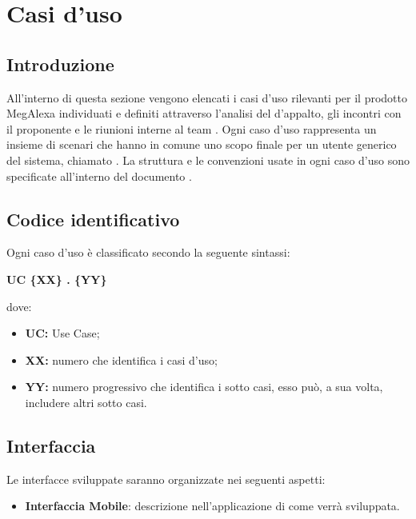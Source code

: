 \section{Casi d'uso}

\subsection{Introduzione}
All'interno di questa sezione vengono elencati i casi d'uso rilevanti per il prodotto
MegAlexa individuati e definiti attraverso l'analisi del  d'appalto,
gli incontri con il proponente e le riunioni interne al team \groupName{}.
Ogni caso d'uso rappresenta un insieme di scenari che hanno in comune uno scopo finale per un utente generico del sistema, chiamato .
La struttura e le convenzioni usate in ogni caso d'uso sono specificate all'interno del documento \docNameVersionNdP{}.

\subsection{Codice identificativo}
Ogni caso d'uso è classificato secondo la seguente sintassi:

\begin{center}
\textbf{UC \{XX\} . \{YY\}}
\end{center}

dove:

\begin{itemize}
    \item \textbf{UC:} Use Case;
    \item \textbf{{XX}:} numero che identifica i casi d'uso;
    \item \textbf{{YY}:} numero progressivo che identifica i sotto casi, esso può, a sua volta, includere altri sotto casi.
\end{itemize}


\subsection{Interfaccia}
Le interfacce sviluppate saranno organizzate nei seguenti aspetti:
\begin{itemize}
    \item \textbf{Interfaccia Mobile}: descrizione nell'applicazione  di come verrà sviluppata.
\end{itemize}


